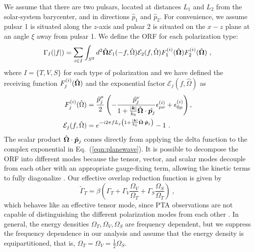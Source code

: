 \documentclass[prd,twocolumn,aps,psfig,nofootinbib,nobibnotes,superscriptaddress,preprintnumbers,times]{revtex4-2}
\begin{document}
We assume that there are two pulsars, located at distances $L_1$ and $L_2$ from the solar-system barycenter, and in directions $\hat{p}_1$ and $\hat{p}_2$. For convenience, we assume pulsar 1 is situated along the $z$-axis and pulsar 2 is situated on the $x-z$ plane at an angle $\xi$ away from pulsar 1. We define the ORF for each polarization type: 
\begin{equation}\label{eq:orf_type}
    \Gamma_I(|f|) = \mathlarger{\sum}_{i \in I} \int_{S^2} d^2 \hat{\bf{\Omega}} \mathcal{E}_1(-f, \hat{\Omega}) \mathcal{E}_2(f, \hat{\Omega}) F_1^{(i)}(\hat{\bf{\Omega}}) F_2^{(i)}(\hat{\bf{\Omega}}) \ ,
\end{equation}
where $I = \{T,V,S\}$ for each type of polarization and we have defined the receiving function $F^{(i)}_j(\hat{\bf \Omega})$ and the exponential factor $\mathcal{E}_j(f, \hat{\Omega})$ as 
\begin{equation}\label{eqn:recieving}
    \begin{aligned}
        F^{(i)}_j(\hat{\Omega}) &= \frac{\hat{p}^\mu_j}{2}\left(-\frac{\hat{p}^\nu_j}{1+\frac{|\boldsymbol{k}|}{k_0} \hat{\boldsymbol{\Omega}} \cdot \hat{{\boldsymbol{p}}_j}} \epsilon_{\mu \nu}^{(i)}+\epsilon_{0 \mu}^{(i)}\right) , \\ 
        \mathcal{E}_j(f, \hat{\Omega}) &= e^{-i2\pi f L_j\left( 1 + \frac{|\boldsymbol{k}|}{k_0} \hat{\bf \Omega}\cdot \hat{\boldsymbol{p}}_j\right)} - 1 \ . 
    \end{aligned}
\end{equation}
The scalar product $\hat{\bf \Omega}\cdot \hat{\boldsymbol{p}}_j$ comes directly from applying the delta function to the complex exponential in 
Eq.~(\ref{eqn:planewave}). 
It is possible to decompose the ORF into different modes because the tensor, vector, and scalar modes decouple from each other with an appropriate gauge-fixing term, allowing the kinetic terms to fully diagonalize \cite{Hinterbichler:2011tt}. Our effective overlap reduction function is given by 
\begin{equation}\label{eq:eff_orf}
    \tilde{\Gamma}_{T} = \beta \left(\Gamma_{T} + \Gamma_{V} \frac{\Omega_V}{\Omega_T} + \Gamma_{S} \frac{\Omega_S}{\Omega_T} \right) \ ,
\end{equation}
which behaves like an effective tensor mode, since PTA observations are not capable of distinguishing the different polarization modes from each other \cite{Liang:2021bct}. In general, the energy densities $\Omega_T, \Omega_V,\Omega_S$ are frequency dependent, but we suppress the frequency dependence in our analysis and assume that the energy density is equipartitioned, that is, $\Omega_T = \Omega_V = \frac{1}{2}\Omega_S$. 
\end{document}
